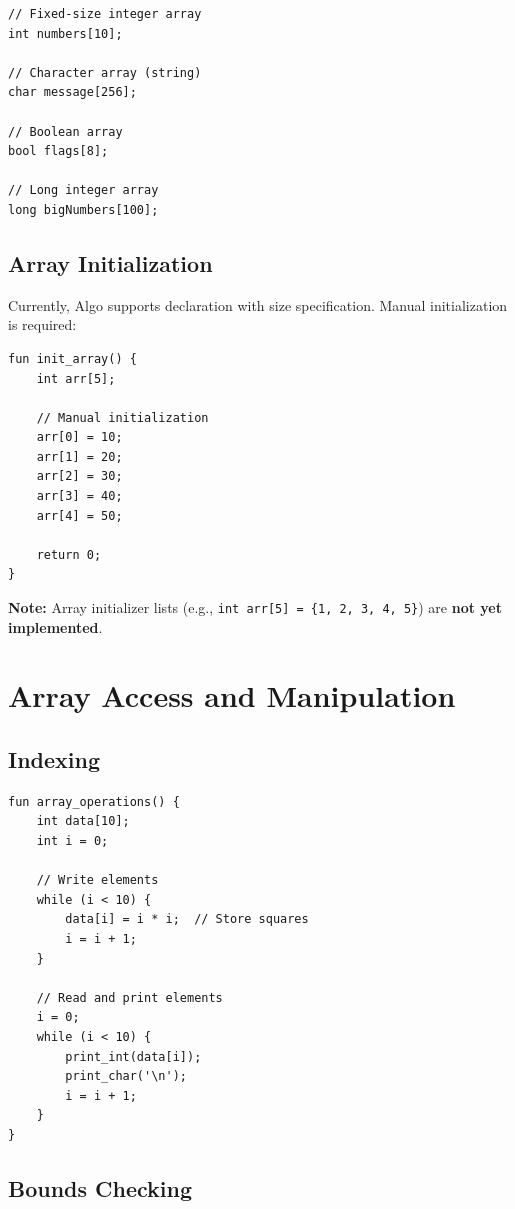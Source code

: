\documentclass[12pt,a4paper,oneside]{book}
\newcommand{\code}[1]{\texttt{#1}}
\begin{document}
\begin{lstlisting}[style=algo, caption={Array Declaration Syntax}]
// Fixed-size integer array
int numbers[10];

// Character array (string)
char message[256];

// Boolean array
bool flags[8];

// Long integer array
long bigNumbers[100];
\end{lstlisting}

\subsection{Array Initialization}

Currently, Algo supports declaration with size specification. Manual initialization is required:

\begin{lstlisting}[style=algo, caption={Initializing Arrays}]
fun init_array() {
    int arr[5];
    
    // Manual initialization
    arr[0] = 10;
    arr[1] = 20;
    arr[2] = 30;
    arr[3] = 40;
    arr[4] = 50;
    
    return 0;
}
\end{lstlisting}

\textbf{Note:} Array initializer lists (e.g., \code{int arr[5] = \{1, 2, 3, 4, 5\}}) are \textbf{not yet implemented}.

\section{Array Access and Manipulation}

\subsection{Indexing}

\begin{lstlisting}[style=algo, caption={Array Element Access}]
fun array_operations() {
    int data[10];
    int i = 0;
    
    // Write elements
    while (i < 10) {
        data[i] = i * i;  // Store squares
        i = i + 1;
    }
    
    // Read and print elements
    i = 0;
    while (i < 10) {
        print_int(data[i]);
        print_char('\n');
        i = i + 1;
    }
}
\end{lstlisting}

\subsection{Bounds Checking}
\end{document}
